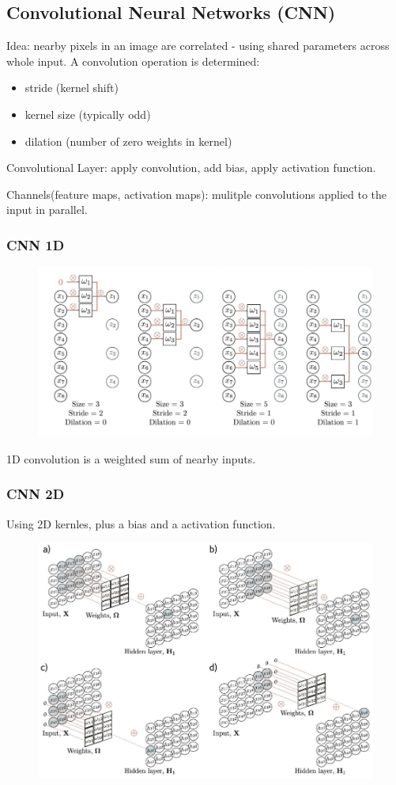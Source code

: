  \subsection{Convolutional Neural Networks (CNN)}
 Idea: nearby pixels in an image are correlated - using shared parameters across whole input.
 A convolution operation is determined:
 \begin{itemize}
     \item stride (kernel shift)
     \item kernel size (typically odd)
     \item dilation (number of zero weights in kernel)
 \end{itemize}
 Convolutional Layer: apply convolution, add bias, apply activation function.

 Channels(feature maps, activation maps): mulitple convolutions applied to the input in parallel.
\subsubsection{CNN 1D}
\begin{figure}[!h]
    \includegraphics[width = \columnwidth]{figures/06/1DConv.png}
 \end{figure}
1D convolution is a weighted sum of nearby inputs.

\subsubsection{CNN 2D}
Using 2D kernles, plus a bias and a activation function.
\begin{figure}[!h]
    \includegraphics[width = \columnwidth]{figures/06/2DConv.png}
 \end{figure}

